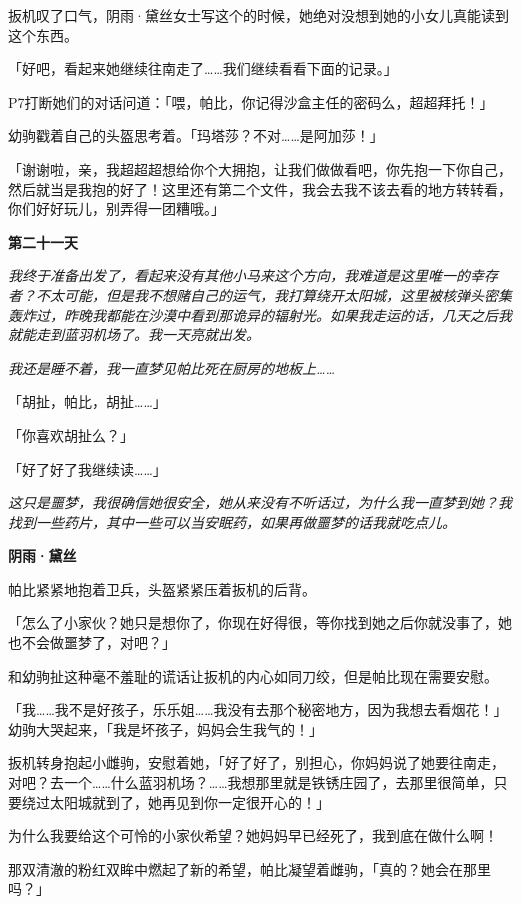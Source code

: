 扳机叹了口气，阴雨·黛丝女士写这个的时候，她绝对没想到她的小女儿真能读到这个东西。

「好吧，看起来她继续往南走了……我们继续看看下面的记录。」

P7打断她们的对话问道：「喂，帕比，你记得沙盒主任的密码么，超超拜托！」

幼驹戳着自己的头盔思考着。「玛塔莎？不对……是阿加莎！」

「谢谢啦，亲，我超超超想给你个大拥抱，让我们做做看吧，你先抱一下你自己，然后就当是我抱的好了！这里还有第二个文件，我会去我不该去看的地方转转看，你们好好玩儿，别弄得一团糟哦。」

\begin{center}
\textbf{第二十一天}
\end{center}

\emph{我终于准备出发了，看起来没有其他小马来这个方向，我难道是这里唯一的幸存者？不太可能，但是我不想赌自己的运气，我打算绕开太阳城，这里被核弹头密集轰炸过，昨晚我都能在沙漠中看到那诡异的辐射光。如果我走运的话，几天之后我就能走到蓝羽机场了。我一天亮就出发。}

\emph{我还是睡不着，我一直梦见帕比死在厨房的地板上……}

「胡扯，帕比，胡扯……」

「你喜欢胡扯么？」

「好了好了我继续读……」

\emph{这只是噩梦，我很确信她很安全，她从来没有不听话过，为什么我一直梦到她？我找到一些药片，其中一些可以当安眠药，如果再做噩梦的话我就吃点儿。}

\begin{flushright}    
\textbf{阴雨·黛丝}
\end{flushright}

帕比紧紧地抱着卫兵，头盔紧紧压着扳机的后背。

「怎么了小家伙？她只是想你了，你现在好得很，等你找到她之后你就没事了，她也不会做噩梦了，对吧？」

和幼驹扯这种毫不羞耻的谎话让扳机的内心如同刀绞，但是帕比现在需要安慰。

「我……我不是好孩子，乐乐姐……我没有去那个秘密地方，因为我想去看烟花！」幼驹大哭起来，「我是坏孩子，妈妈会生我气的！」

扳机转身抱起小雌驹，安慰着她，「好了好了，别担心，你妈妈说了她要往南走，对吧？去一个……什么蓝羽机场？……我想那里就是铁锈庄园了，去那里很简单，只要绕过太阳城就到了，她再见到你一定很开心的！」

为什么我要给这个可怜的小家伙希望？她妈妈早已经死了，我到底在做什么啊！

那双清澈的粉红双眸中燃起了新的希望，帕比凝望着雌驹，「真的？她会在那里吗？」

